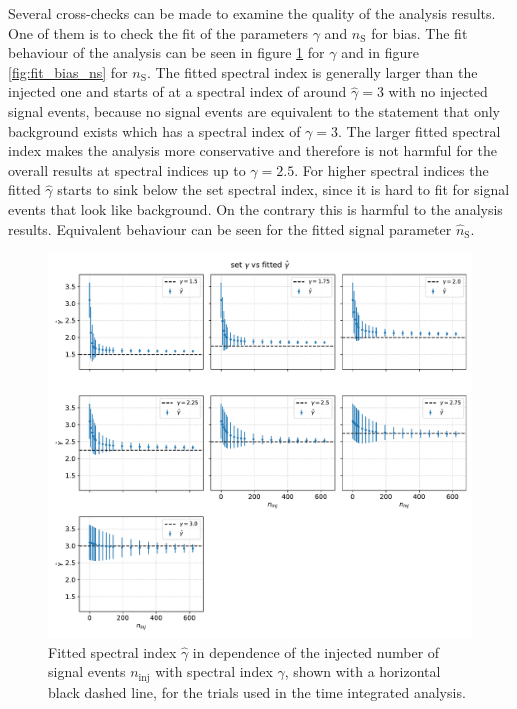 Several cross-checks can be made to examine the quality of the analysis results.
One of them is to check the fit of the parameters $\gamma$ and $n_\text{S}$ for bias.
The fit behaviour of the analysis can be seen in figure \ref{fig:fit_bias_gamma} for $\gamma$ and in figure \ref{fig:fit_bias_ns} for $n_\text{S}$.
The fitted spectral index is generally larger than the injected one and starts of at a spectral index of around $\hat\gamma = \num{3}$ with no injected signal events, because no signal events are equivalent to the statement that only background exists which has a spectral index of $\gamma = \num{3}$.
The larger fitted spectral index makes the analysis more conservative and therefore is not harmful for the overall results at spectral indices up to $\gamma = \num{2.5}$.
For higher spectral indices the fitted $\hat\gamma$ starts to sink below the set spectral index, since it is hard to fit for signal events that look like background. On the contrary this is harmful to the analysis results.
Equivalent behaviour can be seen for the fitted signal parameter $\hat{n}_\text{S}$.
\begin{figure}
    \centering
    \includegraphics[width=\linewidth]{Plots/05_csky/gamma_fit_auto_3.pdf}
    \caption{Fitted spectral index $\hat\gamma$ in dependence of the injected number of signal events $n_\text{inj}$ with spectral index $\gamma$, shown with a horizontal black dashed line, for the trials used in the time integrated analysis.}
    \label{fig:fit_bias_gamma}
\end{figure}


